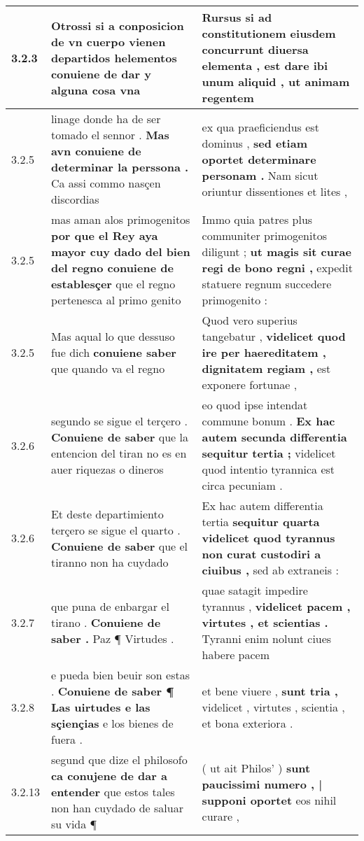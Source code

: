 \begin{tabular}{|p{1cm}|p{6.5cm}|p{6.5cm}|}
3.2.3 & Otrossi si a conposicion de vn cuerpo vienen departidos helementos \textbf{ conuiene de dar } y alguna cosa vna & Rursus si ad constitutionem eiusdem concurrunt diuersa elementa , \textbf{ est dare ibi unum aliquid , } ut animam regentem \\\hline
3.2.5 & linage donde ha de ser tomado el sennor . \textbf{ Mas avn conuiene de determinar la perssona . } Ca assi commo nasçen discordias & ex qua praeficiendus est dominus , \textbf{ sed etiam oportet determinare personam . } Nam sicut oriuntur dissentiones et lites , \\\hline
3.2.5 & mas aman alos primogenitos \textbf{ por que el Rey aya mayor cuy dado del bien del regno conuiene de establesçer } que el regno pertenesca al primo genito & Immo quia patres plus communiter primogenitos diligunt ; \textbf{ ut magis sit curae regi de bono regni , } expedit statuere regnum succedere primogenito : \\\hline
3.2.5 & Mas aqual lo que dessuso fue dich \textbf{ conuiene saber } que quando va el regno & Quod vero superius tangebatur , \textbf{ videlicet quod ire per haereditatem , dignitatem regiam , } est exponere fortunae , \\\hline
3.2.6 & segundo se sigue el terçero . \textbf{ Conuiene de saber } que la entencion del tiran no es en auer riquezas o dineros & eo quod ipse intendat commune bonum . \textbf{ Ex hac autem secunda differentia sequitur tertia ; } videlicet quod intentio tyrannica est circa pecuniam . \\\hline
3.2.6 & Et deste departimiento terçero se sigue el quarto . \textbf{ Conuiene de saber } que el tiranno non ha cuydado & Ex hac autem differentia tertia \textbf{ sequitur quarta videlicet quod tyrannus non curat custodiri a ciuibus , } sed ab extraneis : \\\hline
3.2.7 & que puna de enbargar el tirano . \textbf{ Conuiene de saber . } Paz ¶ Virtudes . & quae satagit impedire tyrannus , \textbf{ videlicet pacem , virtutes , et scientias . } Tyranni enim nolunt ciues habere pacem \\\hline
3.2.8 & e pueda bien beuir son estas . \textbf{ Conuiene de saber ¶ Las uirtudes e las sçiençias } e los bienes de fuera . & et bene viuere , \textbf{ sunt tria , } videlicet , virtutes , scientia , et bona exteriora . \\\hline
3.2.13 & segund que dize el philosofo \textbf{ ca conujene de dar a entender } que estos tales non han cuydado de saluar su vida ¶ & ( ut ait Philos’ ) \textbf{ sunt paucissimi numero , | supponi oportet } eos nihil curare , \\\hline

\end{tabular}

